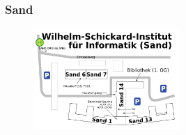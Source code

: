 \subsubsection*{Sand}
\begin{figure}[ht!]
	\centering
	\includegraphics[width=0.5\textwidth]{shared/anhang/lageplaene/uebersicht_sand.pdf}
\end{figure}
